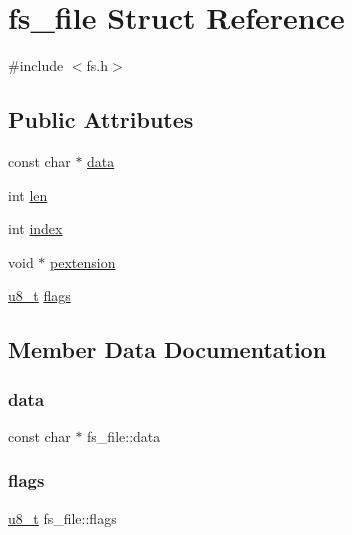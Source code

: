\hypertarget{structfs__file}{}\section{fs\+\_\+file Struct Reference}
\label{structfs__file}


{\ttfamily \#include $<$fs.\+h$>$}

\subsection*{Public Attributes}
\begin{DoxyCompactItemize}
\item 
const char $\ast$ \hyperlink{structfs__file_a97249ad8796c3b2b98e5022c3cdf7c56}{data}
\item 
int \hyperlink{structfs__file_a99a16a5082bf9510cb1cb8069402f1f0}{len}
\item 
int \hyperlink{structfs__file_af27b72371512e6cbf6104bc3a7063aab}{index}
\item 
void $\ast$ \hyperlink{structfs__file_ac8c7eb661338414025e5ed8ff3153df5}{pextension}
\item 
\hyperlink{group__compiler__abstraction_ga4caecabca98b43919dd11be1c0d4cd8e}{u8\+\_\+t} \hyperlink{structfs__file_a61973387cec852f3eca876acf288ca01}{flags}
\end{DoxyCompactItemize}


\subsection{Member Data Documentation}
\mbox{\label{structfs__file_a97249ad8796c3b2b98e5022c3cdf7c56}} 
\subsubsection{\texorpdfstring{data}{data}}
{\footnotesize\ttfamily const char $\ast$ fs\+\_\+file\+::data}

\mbox{\label{structfs__file_a61973387cec852f3eca876acf288ca01}} 
\subsubsection{\texorpdfstring{flags}{flags}}
{\footnotesize\ttfamily \hyperlink{group__compiler__abstraction_ga4caecabca98b43919dd11be1c0d4cd8e}{u8\+\_\+t} fs\+\_\+file\+::flags}

